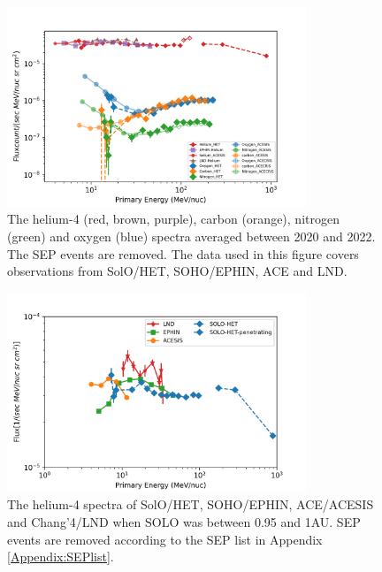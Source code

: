 \begin{figure}[!htb]
    \centering
    \includegraphics[width = 0.8\textwidth]{images/ACR/ACE_SIS_CRIS_SOLO_all_3.png}
    \caption[The quite time spactra of helium, carbon, nitrogen and oxygen between 2020 and 2022]{The helium-4 (red, brown, purple), carbon (orange), nitrogen (green) and oxygen (blue) spectra averaged between 2020 and 2022. The \ac{SEP} events are removed. The data used in this figure covers observations from \ac{SolO}/\ac{HET}, \ac{SOHO}/\ac{EPHIN}, \ac{ACE} and \ac{LND}.}
    \label{fig:overview}
\end{figure}
\begin{figure}[!htb]
    \centering
    \includegraphics[width = 0.8\textwidth]{images/ACR/1AU_comparison_ACE_EPHIN_SOLO_SEP_version2.png}
    \caption[The helium spectra when \ac{SolO} was between 0.95 and 1 au]{The helium-4 spectra of \ac{SolO}/\ac{HET}, \ac{SOHO}/\ac{EPHIN}, \ac{ACE}/\ac{ACESIS} and Chang'4/\ac{LND} when SOLO was between 0.95 and 1AU. \ac{SEP} events are removed according to the \ac{SEP} list in Appendix \ref{Appendix:SEPlist}.}
    \label{fig:helium_spec_1au}
\end{figure}

